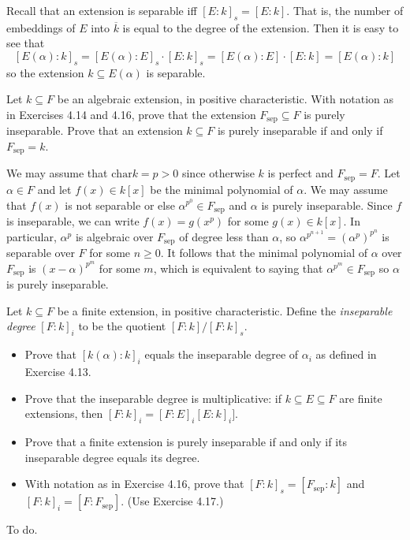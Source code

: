 \documentclass[../../master.tex]{subfiles}
\begin{document}
\begin{solution}
    Recall that an extension is separable iff $[E : k]_s = [E : k]$.
    That is, the number of embeddings of $E$ into $\overline{k}$ is equal to the degree of the extension.
    Then it is easy to see that
    \[
        [E(\alpha) : k]_s = [E(\alpha) : E]_s \cdot [E : k]_s = [E(\alpha) : E] \cdot [E : k] = [E(\alpha) : k]
    \]
    so the extension $k \subseteq E(\alpha)$ is separable.
\end{solution}

\begin{problem}
    Let $k \subseteq F$ be an algebraic extension, in positive characteristic.
    With notation as in Exercises 4.14 and 4.16, prove that the extension $F_{\text{sep}} \subseteq F$ is purely inseparable.
    Prove that an extension $k \subseteq F$ is purely inseparable if and only if $F_{\text{sep}} = k$.
\end{problem}

\begin{solution}
    We may assume that $\text{char} k = p > 0$ since otherwise $k$ is perfect and $F_{\text{sep}} = F$.
    Let $\alpha \in F$ and let $f(x) \in k[x]$ be the minimal polynomial of $\alpha$.
    We may assume that $f(x)$ is not separable or else $\alpha^{p^{0}} \in F_{\text{sep}}$ and $\alpha$ is purely inseparable.
    Since $f$ is inseparable, we can write $f(x) = g(x^{p})$ for some $g(x) \in k[x]$.
    In particular, $\alpha^{p}$ is algebraic over $F_{\text{sep}}$ of degree less than $\alpha$, so $\alpha^{p^{n+1}} = (\alpha^{p})^{p^{n}}$ is separable over $F$ for some $n \geq 0$.
    It follows that the minimal polynomial of $\alpha$ over $F_{\text{sep}}$ is $(x - \alpha)^{p^{m}}$ for some $m$, which is equivalent to saying that $\alpha^{p^{m}} \in F_{\text{sep}}$ so $\alpha$ is purely inseparable.
\end{solution}

\begin{problem}
    Let $k \subseteq F$ be a finite extension, in positive characteristic.
    Define the \textit{inseparable degree} $[F : k]_i$ to be the quotient $[F : k] / [F : k]_s$.
    \begin{itemize}
        \item Prove that $[k(\alpha) : k]_i$ equals the inseparable degree of $\alpha_i$ as defined in Exercise 4.13.
        \item Prove that the inseparable degree is multiplicative:
            if $k \subseteq E \subseteq F$ are finite extensions, then $[F : k]_i = [F : E]_i [E : k]_i]$.
        \item Prove that a finite extension is purely inseparable if and only if its inseparable degree equals its degree.
        \item With notation as in Exercise 4.16, prove that $[F : k]_s = [F_{\text{sep}} : k]$ and $[F : k]_i = [F : F_{\text{sep}}]$.
            (Use Exercise 4.17.)
    \end{itemize}
\end{problem}

\begin{solution}
    To do.
\end{solution}
\end{document}
